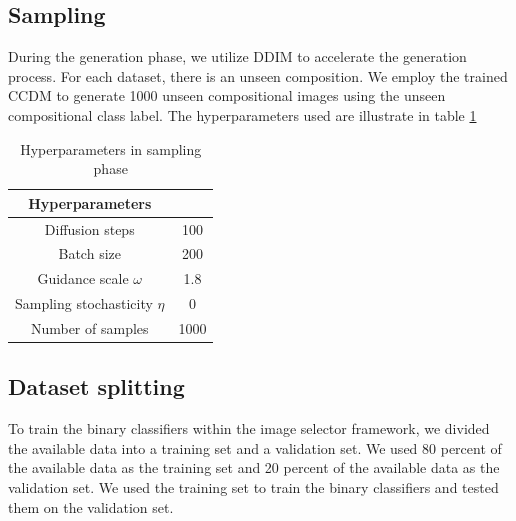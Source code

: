 \subsection{Sampling}
During the generation phase, we utilize DDIM \cite{ho2020denoising} to accelerate the generation process. For each dataset, there is an unseen composition. We employ the trained CCDM to generate 1000 unseen compositional images using the unseen compositional class label. The hyperparameters used are illustrate in table \ref{tab:samplinghyperparameters}
\begin{table} [H]
    \centering
    \begin{tabular}{c|c}
        Hyperparameters & \\
        \hline
         Diffusion steps & 100\\
         Batch size & 200\\
         Guidance scale $\omega$ & 1.8\\
         Sampling stochasticity $\eta$ & 0\\
         Number of samples & 1000\\
    \end{tabular}
    \caption{Hyperparameters in sampling phase}
    \label{tab:samplinghyperparameters}
\end{table}

\subsection{Dataset splitting}
To train the binary classifiers within the image selector framework, we divided the available data into a training set and a validation set. We used 80 percent of the available data as the training set and 20 percent of the available data as the validation set. We used the training set to train the binary classifiers and tested them on the validation set.

